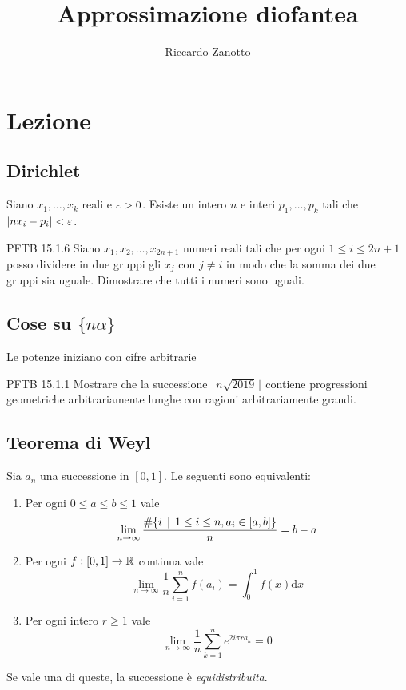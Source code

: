 \documentclass[12pt]{article}
\author{Riccardo Zanotto}
\title{Approssimazione diofantea}
\begin{document}
\maketitle

\section{Lezione}

\subsection{Dirichlet} 

\begin{theorem}
    Siano $x_1,\dots,x_k$ reali e $\varepsilon>0$. Esiste un intero $n$ e interi $p_1,\dots,p_k$ tali che $|nx_i-p_i|<\varepsilon$.
\end{theorem}

\begin{esercizio}{PFTB 15.1.6}{}
    Siano $x_1,x_2,\dots,x_{2n+1}$ numeri reali tali che per ogni $1\le i\le2n+1$ posso dividere in due gruppi gli $x_j$ con $j\neq i$ in modo che la somma dei due gruppi sia uguale. Dimostrare che tutti i numeri sono uguali.
\end{esercizio}

\subsection{Cose su $\{ n\alpha \}$}

\begin{lemma}
     Le potenze iniziano con cifre arbitrarie
\end{lemma}

\begin{esercizio}{PFTB 15.1.1}{}
    Mostrare che la successione $\lfloor n\sqrt{2019}\rfloor$ contiene progressioni geometriche arbitrariamente lunghe con ragioni arbitrariamente grandi.
\end{esercizio}

\subsection{Teorema di Weyl}

\begin{theorem}
    Sia $a_n$ una successione in $[0,1]$. Le seguenti sono equivalenti:
    \begin{enumerate}
        \item Per ogni $0\le a\le b\le 1$ vale $$ \lim_{n\to\infty}\frac{\#\{ i\operatorname{\; |\;} 1\le i\le n, a_i\in[a,b] \}}{n} = b-a $$
        \item Per ogni $f:[0,1]\to\mathbb{R}$ continua vale $$ \lim_{n\to\infty}\frac{1}{n}\sum_{i=1}^n f(a_i)=\int_0^1 f(x)\mathrm{d}x$$
        \item Per ogni intero $r\ge1$ vale $$ \lim_{n\to\infty}\frac1n\sum_{k=1}^ne^{2i\pi r a_k} = 0 $$
    \end{enumerate}
    Se vale una di queste, la successione è \emph{equidistribuita}.
\end{theorem}
\end{document}
